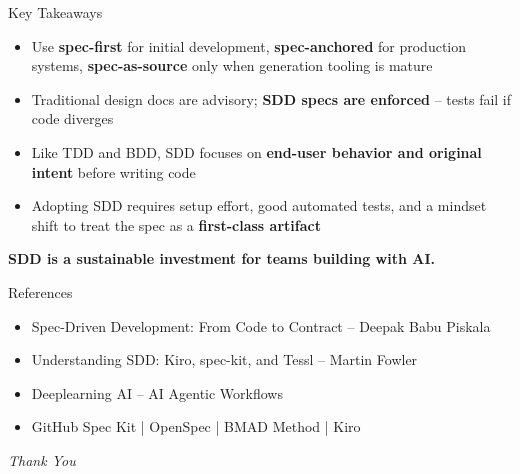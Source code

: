 \documentclass[aspectratio=169]{beamer}
\begin{document}
\begin{frame}{Key Takeaways}
    \begin{itemize}
        \item Use \textbf{spec-first} for initial development, \textbf{spec-anchored} for production systems, \textbf{spec-as-source} only when generation tooling is mature

        \vspace{0.2cm}
        \item Traditional design docs are advisory; \textbf{SDD specs are enforced} -- tests fail if code diverges

        \vspace{0.2cm}
        \item Like TDD and BDD, SDD focuses on \textbf{end-user behavior and original intent} before writing code

        \vspace{0.2cm}
        \item Adopting SDD requires setup effort, good automated tests, and a mindset shift to treat the spec as a \textbf{first-class artifact}
    \end{itemize}

    \vspace{0.3cm}
    \colorbox{utu_green!20}{\parbox{0.9\textwidth}{
        \centering
        \textbf{SDD is a sustainable investment for teams building with AI.}
    }}
\end{frame}

\begin{frame}{References}
    {\small
    \begin{itemize}
        \item Spec-Driven Development: From Code to Contract -- Deepak Babu Piskala
        \item Understanding SDD: Kiro, spec-kit, and Tessl -- Martin Fowler
        \item Deeplearning AI -- AI Agentic Workflows
        \item GitHub Spec Kit | OpenSpec | BMAD Method | Kiro
    \end{itemize}
    }
\end{frame}

\begin{frame}
    \begin{center}
        {\Huge\textit{Thank You}}
    \end{center}
\end{frame}
\end{document}
